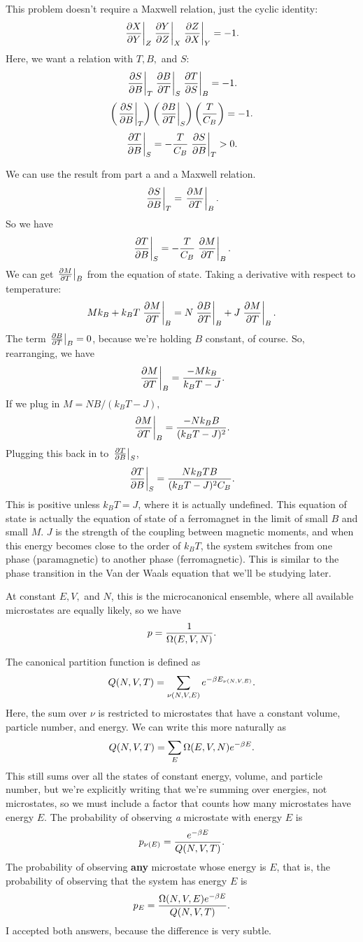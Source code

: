 \documentclass[12pt]{article}
\begin{document}
\hrulefill

 This problem doesn't require a Maxwell relation, just the cyclic identity:
\[ \left.\frac{\partial{X}}{\partial{Y}}\right|_{Z} \left.\frac{\partial{Y}}{\partial{Z}}\right|_{X} \left.\frac{\partial{Z}}{\partial{X}}\right|_{Y} = -1.\]
Here, we want a relation with $T,B,$ and $S$:
\[ \left.\frac{\partial{S}}{\partial{B}}\right|_{T}\left.\frac{\partial{B}}{\partial{T}}\right|_{S}\left.\frac{\partial{T}}{\partial{S}}\right|_{B} = -1.\]
\[ \left(\left.\frac{\partial{S}}{\partial{B}}\right|_{T}\right) \left( \left.\frac{\partial{B}}{\partial{T}}\right|_{S}\right) \left(\frac{T}{C_B}\right) = -1.\]
\[ \left.\frac{\partial{T}}{\partial{B}}\right|_{S} = -\frac{T}{C_B}\left.\frac{\partial{S}}{\partial{B}}\right|_{T} > 0.\]

 We can use the result from part a and a Maxwell relation.
\[ \left.\frac{\partial{S}}{\partial{B}}\right|_{T} = \left.\frac{\partial{M}}{\partial{T}}\right|_{B}.\]
So we have
\[ \left.\frac{\partial{T}}{\partial{B}}\right|_{S} = -\frac{T}{C_B}\left.\frac{\partial{M}}{\partial{T}}\right|_{B}.\]
We can get $\left.\frac{\partial{M}}{\partial{T}}\right|_{B}$ from the equation of state. Taking a derivative with respect to temperature:
\[ Mk_B + k_BT \left.\frac{\partial{M}}{\partial{T}}\right|_{B} = N\left.\frac{\partial{B}}{\partial{T}}\right|_{B} + J\left.\frac{\partial{M}}{\partial{T}}\right|_{B}.\]
The term $\left.\frac{\partial{B}}{\partial{T}}\right|_{B} = 0$, because we're holding $B$ constant, of course. So, rearranging, we have
\[ \left.\frac{\partial{M}}{\partial{T}}\right|_{B} = \frac{-Mk_B}{k_BT-J}.\]
If we plug in $M = NB/(k_BT-J),$
\[ \left.\frac{\partial{M}}{\partial{T}}\right|_{B} = \frac{-Nk_B B}{(k_BT-J)^2}.\]
Plugging this back in to $\left.\frac{\partial{T}}{\partial{B}}\right|_{S}$,
\[ \left.\frac{\partial{T}}{\partial{B}}\right|_{S} = \frac{Nk_BT B}{(k_BT-J)^2C_B}.\]
This is positive unless $k_BT = J$, where it is actually undefined. This equation of state is actually the equation of state of a ferromagnet in the limit of small $B$ and small $M$. $J$ is the strength of the coupling between magnetic moments, and when this energy becomes close to the order of $k_BT$, the system switches from one phase (paramagnetic) to another phase (ferromagnetic). This is similar to the phase transition in the Van der Waals equation that we'll be studying later.

\hrulefill

 At constant $E,V,$ and $N$, this is the microcanonical ensemble, where all available microstates are equally likely, so we have
\[ p = \frac{1}{\Omega(E,V,N)}.\]

 The canonical partition function is defined as
\[ Q(N,V,T) = \sum_{\nu(N,V,E)} e^{-\beta E_{\nu(N,V,E)}}.\]
Here, the sum over $\nu$ is restricted to microstates that have a constant volume, particle number, and energy. We can write this more naturally as
\[ Q(N,V,T) = \sum_E \Omega(E,V,N) e^{-\beta E}.\]
This still sums over all the states of constant energy, volume, and particle number, but we're explicitly writing that we're summing over energies, not microstates, so we must include a factor that counts how many microstates have energy $E$. The probability of observing \emph{a} microstate with energy $E$ is
\[ p_{\nu(E)} = \frac{e^{-\beta E}}{Q(N,V,T)}.\]
The probability of observing \textbf{any} microstate whose energy is $E$, that is, the probability of observing that the system has energy $E$ is
\[ p_E = \frac{\Omega(N,V,E)e^{-\beta E}}{Q(N,V,T)}.\]
I accepted both answers, because the difference is very subtle.
\end{document}
